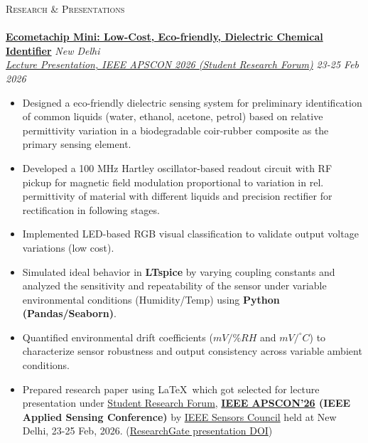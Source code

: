 \documentclass[a4paper]{article}
\newcommand{\lineunder} {
    \vspace*{-8pt} \\
    \hspace*{-18pt} \hrulefill \\
}
\newcommand{\header} [1] {
    {\hspace*{-18pt}\vspace*{6pt} \textsc{#1}}
    \vspace*{-6pt} \lineunder
}
\begin{document}
\header{Research \& Presentations}
\textbf{\href{https://github.com/aaromalonline/ecometachip}{Ecometachip Mini: Low-Cost, Eco-friendly, Dielectric Chemical Identifier}} \hfill \textit{New Delhi} \\
\textit{\href{https://epapers2.org/apscon2026/ESR/paper_details.php?paper_id=6101}{Lecture Presentation, IEEE APSCON 2026 (Student Research Forum)}} \hfill \textit{23-25 Feb 2026}
\begin{itemize} \itemsep 1pt
    \item Designed a eco-friendly dielectric sensing system for preliminary identification of common liquids (water, ethanol, acetone, petrol) based on relative permittivity variation in a biodegradable coir-rubber composite as the primary sensing element.
    \item Developed a 100 MHz Hartley oscillator-based readout circuit with RF pickup for magnetic field modulation proportional to variation in rel. permittivity of material with different liquids and precision rectifier for rectification in following stages.
    \item Implemented LED-based RGB visual classification to validate output voltage variations (low cost).
    \item Simulated ideal behavior in \textbf{LTspice} by varying coupling constants and analyzed the sensitivity and repeatability of the sensor under variable environmental conditions (Humidity/Temp) using \textbf{Python (Pandas/Seaborn)}.
    \item Quantified environmental drift coefficients ($mV/\%RH$ and $mV/^\circ C$) to characterize sensor robustness and output consistency across variable ambient conditions.
    \item Prepared research paper using \LaTeX\ which got selected for lecture presentation under \href{https://epapers2.org/apscon2026/ESR/session_view.php?session_id=35}{Student Research Forum}, \textbf{\href{https://2026.ieee-apscon.org/}{IEEE APSCON'26} (IEEE Applied Sensing Conference)} by \href{https://ieee-sensors.org/}{IEEE Sensors Council} held at New Delhi, 23-25 Feb, 2026. (\href{https://www.researchgate.net/publication/401928480_Certificate_for_presentation}{ResearchGate presentation DOI})
\end{itemize}
\end{document}
